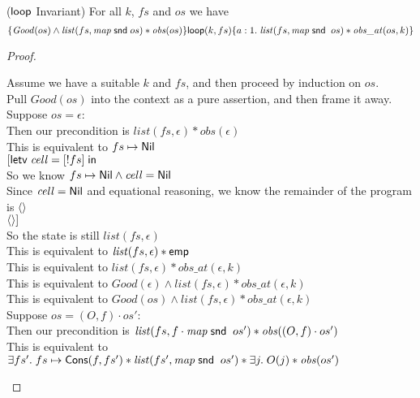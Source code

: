\begin{lemma}{($\mathsf{loop}$ Invariant)}
For all $k$, $fs$  and $os$ we have
\begin{displaymath}
\{{\mathit{Good}(os) \land \mathit{list}(fs, \mathit{map}\;\mathsf{snd}\;os) * \mathit{obs}(os)}\}{\mathsf{loop}(k, fs)}\{{a:1}.\;{\mathit{list}(fs, \mathit{map}\;\mathsf{snd}\;\;os) * \mathit{obs\_at}(os, k)}\}
\end{displaymath}
\end{lemma}
\begin{proof}
\begin{tabbedproof}
\oo Assume we have a suitable $k$ and $fs$, and then proceed by induction on $os$.  \\
\oo Pull $\mathit{Good}(os)$ into the context as a pure assertion, and then frame it away. \\
\oo Suppose $os = \epsilon$:  \\
\ooo Then our precondition is $\mathit{list}(fs, \epsilon) * \mathit{obs}(\epsilon)$ \\
\ooo This is equivalent to $fs \mapsto \mathsf{Nil}$ \\
\ooo $[\mathsf{letv}\;\mathit{cell} = [!fs]\;\mathsf{in}\;$  \\
\ooo So we know $fs \mapsto \mathsf{Nil} \land \mathit{cell} = \mathsf{Nil}$ \\
\ooo Since $\mathit{cell} = \mathsf{Nil}$ and equational reasoning, we know the remainder of the program is $\left<\right>$\\
\ooo $\left<\right>]$ \\
\ooo So the state is still $\mathit{list}(fs, \epsilon)$ \\
\ooo This is equivalent to $\mathit{list}(fs, \epsilon) * \mathsf{emp}$ \\
\ooo This is equivalent to $\mathit{list}(fs, \epsilon) * \mathit{obs\_at}(\epsilon, k)$ \\
\ooo This is equivalent to $\mathit{Good}(\epsilon) \land \mathit{list}(fs, \epsilon) * \mathit{obs\_at}(\epsilon, k)$ \\
\ooo This is equivalent to $\mathit{Good}(os) \land \mathit{list}(fs, \epsilon) * \mathit{obs\_at}(\epsilon, k)$ \\
\oo Suppose $os = (O,f) \cdot os'$:  \\
\ooo Then our precondition is $\mathit{list}(fs, f \cdot \mathit{map}\;\mathsf{snd}\;\;os') * \mathit{obs}((O,f)\cdot os')$ \\
\ooo This is equivalent to $\exists fs'.\; fs \mapsto \mathsf{Cons}(f, fs') * \mathit{list}(fs',  \mathit{map}\;\mathsf{snd}\;\; os') * \exists j.\;O(j) * \mathit{obs}( os')$ \\

\end{tabbedproof}
\end{proof}
